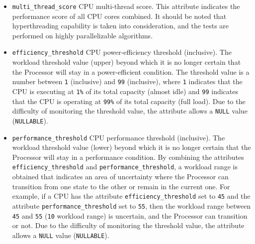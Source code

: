 \begin{itemize}
  \item \texttt{multi\_thread\_score}
    \newline
    CPU multi-thread score.
    \newline
    This attribute indicates the performance score of all CPU cores combined.
    \newline
    It should be noted that hyperthreading capability is taken into
    consideration, and the tests are performed on highly parallelizable algorithms.

  \item \texttt{efficiency\_threshold}
    \newline
    CPU power-efficiency threshold (inclusive).
    \newline
    The workload threshold value (upper) beyond which it is no longer certain that
    the Processor will stay in a power-efficient condition.
    \newline
    The threshold value is a number between \texttt{1} (inclusive) and \texttt{99}
    (inclusive), where \texttt{1} indicates that the CPU is executing at \texttt{1\%}
    of its total capacity (almost idle) and \texttt{99} indicates that the CPU is
    operating at \texttt{99\%} of its total capacity (full load).
    \newline
    Due to the difficulty of monitoring the threshold value, the attribute allows
    a \texttt{NULL} value (\texttt{NULLABLE}).

  \item \texttt{performance\_threshold}
    \newline
    CPU performance threshold (inclusive).
    \newline
    The workload threshold value (lower) beyond which it is no longer certain that
    the Processor will stay in a performance condition.
    \newline
    By combining the attributes \texttt{efficiency\_threshold} and \texttt{performance\_threshold},
    a workload range is obtained that indicates an area of uncertainty where the
    Processor can transition from one state to the other or remain in the current
    one. For example, if a CPU has the attribute \texttt{efficiency\_threshold}
    set to \texttt{45} and the attribute \texttt{performance\_threshold} set to
    \texttt{55}, then the workload range between \texttt{45} and \texttt{55} (\texttt{10}
    workload range) is uncertain, and the Processor can transition or not.
    \newline
    Due to the difficulty of monitoring the threshold value, the attribute
    allows a \texttt{NULL} value (\texttt{NULLABLE}).


\end{itemize}
